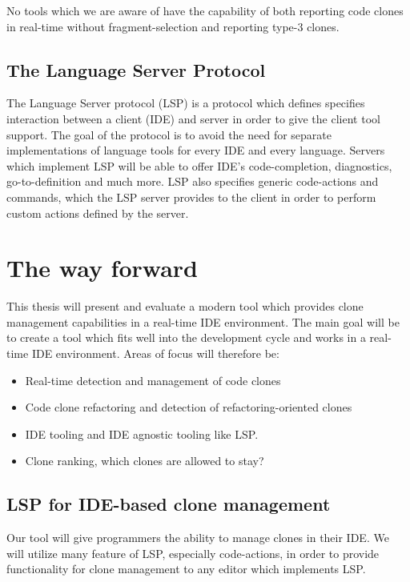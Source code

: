\documentclass[12pt]{article}
\begin{document}
No tools which we are aware of have the capability of both reporting code clones in
real-time without fragment-selection and reporting type-3 clones.

\subsection{The Language Server Protocol}

The Language Server protocol (LSP) is a protocol which defines specifies interaction between a
client (IDE) and server in order to give the client tool support. The goal of the protocol
is to avoid the need for separate implementations of language tools for every IDE and
every language. Servers which implement LSP will be able to offer IDE's code-completion,
diagnostics, go-to-definition and much more. LSP also specifies generic code-actions and
commands, which the LSP server provides to the client in order to perform custom actions
defined by the server. 

\section{The way forward}

This thesis will present and evaluate a modern tool which provides clone management
capabilities in a real-time IDE environment. The main goal will be to create a tool which
fits well into the development cycle and works in a real-time IDE environment. Areas of
focus will therefore be:

\begin{itemize}
	\item Real-time detection and management of code clones
	\item Code clone refactoring and detection of refactoring-oriented clones
	\item IDE tooling and IDE agnostic tooling like LSP.
	\item Clone ranking, which clones are allowed to stay?
\end{itemize}

\subsection{LSP for IDE-based clone management}

Our tool will give programmers the ability to manage clones in their IDE. We will utilize
many feature of LSP, especially code-actions, in order to provide functionality for clone
management to any editor which implements LSP.
\end{document}
